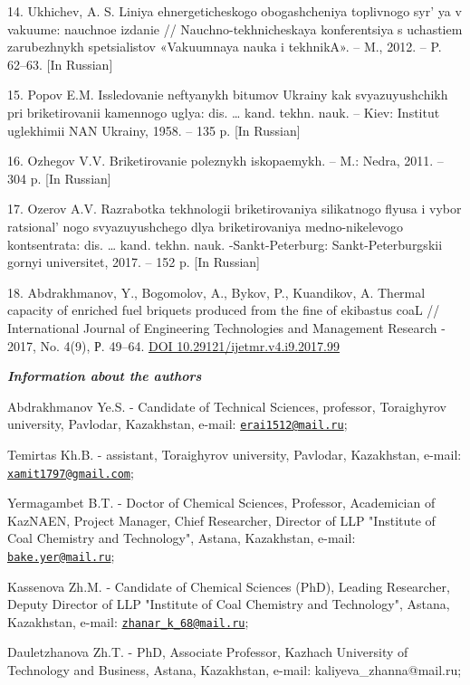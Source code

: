 14. Ukhichev, A. S. Liniya ehnergeticheskogo obogashcheniya toplivnogo
syr' ya v vakuume: nauchnoe izdanie //
Nauchno-tekhnicheskaya konferentsiya s uchastiem zarubezhnykh
spetsialistov «Vakuumnaya nauka i tekhnikA». -- M., 2012. -- P. 62--63.
{[}In Russian{]}

15. Popov E.M. Issledovanie neftyanykh bitumov Ukrainy kak
svyazuyushchikh pri briketirovanii kamennogo uglya: dis. \ldots{} kand.
tekhn. nauk. -- Kiev: Institut uglekhimii NAN Ukrainy, 1958. -- 135 p.
{[}In Russian{]}

16. Ozhegov V.V. Briketirovanie poleznykh iskopaemykh. -- M.: Nedra,
2011. -- 304 p. {[}In Russian{]}

17. Ozerov A.V. Razrabotka tekhnologii briketirovaniya silikatnogo
flyusa i vybor ratsional' nogo svyazuyushchego dlya
briketirovaniya medno-nikelevogo kontsentrata: dis. \ldots{} kand.
tekhn. nauk. -Sankt-Peterburg: Sankt-Peterburgskii gornyi universitet,
2017. -- 152 p. {[}In Russian{]}

18. Abdrakhmanov, Y., Bogomolov, A., Bykov, P., Kuandikov, A. Thermal
capacity of enriched fuel briquets produced from the fine of ekibastus
coaL // International Journal of Engineering Technologies and Management
Research - 2017, No. 4(9), Р. 49--64.
\href{https://doi.org/10.29121/ijetmr.v4.i9.2017.99}{DOI
10.29121/ijetmr.v4.i9.2017.99}

\emph{{\bfseries Information about the authors}}

Abdrakhmanov Ye.S. - Candidate of Technical Sciences, professor,
Toraighyrov university, Pavlodar, Kazakhstan, e-mail:
\href{mailto:erai1512@mail.ru}{\nolinkurl{erai1512@mail.ru}};

Temirtas Kh.B. - assistant, Toraighyrov university, Pavlodar,
Kazakhstan, e-mail:
\href{mailto:xamit1797@gmail.com}{\nolinkurl{xamit1797@gmail.com}};

Yermagambet B.T. - Doctor of Chemical Sciences, Professor, Academician
of KazNAEN, Project Manager, Chief Researcher, Director of LLP
"Institute of Coal Chemistry and Technology", Astana, Kazakhstan,
e-mail: \href{mailto:bake.yer@mail.ru}{\nolinkurl{bake.yer@mail.ru}};

Kassenova Zh.M. - Candidate of Chemical Sciences (PhD), Leading
Researcher, Deputy Director of LLP "Institute of Coal Chemistry and
Technology", Astana, Kazakhstan, e-mail:
\href{mailto:zhanar_k_68@mail.ru}{\nolinkurl{zhanar\_k\_68@mail.ru}};

Dauletzhanova Zh.T. - PhD, Associate Professor, Kazhach University of
Technology and Business, Astana, Kazakhstan, e-mail:
kaliyeva\_zhanna@mail.ru;

